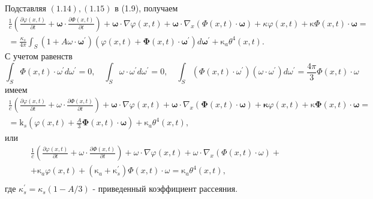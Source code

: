 Подставляя $(1.14),(1.15)$ в (1.9), получаем
\[
    \begin{gathered}
        \frac{1}{c}\left(\frac{\partial \varphi(x, t)}{\partial t}+\boldsymbol{\omega} \cdot
        \frac{\partial \Phi(x, t)}{\partial t}\right)+\boldsymbol{\omega} \cdot \nabla
        \varphi(x, t)+\boldsymbol{\omega} \cdot \nabla_{x}(\Phi(x, t) \cdot \boldsymbol{\omega})+\kappa
        \varphi(x, t)+\mathrm{\kappa} \Phi(x, t) \cdot \boldsymbol{\omega}= \\
        =\frac{\kappa_{s}}{4 \pi} \int_{S}\left(1+A \omega \cdot
        \boldsymbol{\omega}^{\prime}\right)\left(\varphi(x, t)+\boldsymbol{\Phi}(x, t)
        \cdot \boldsymbol{\omega}^{\prime}\right) d \boldsymbol{\omega}^{\prime}+\mathrm{\kappa}_{a} \theta^{4}(x, t).
    \end{gathered}
\]
С учетом равенств
\[
    \int_{S} \Phi(x, t) \cdot \omega^{\prime} d \omega^{\prime}=0, \quad \int_{S} \omega \cdot \omega^{\prime} d
    \omega^{\prime}=0, \quad \int_{S}\left(\Phi(x, t) \cdot \omega^{\prime}\right)\left(\omega \cdot
    \omega^{\prime}\right) d \omega^{\prime}=\frac{4 \pi}{3} \Phi(x, t) \cdot \omega
\]
имеем
\[
    \begin{gathered}
        \frac{1}{c}\left(\frac{\partial \varphi(x, t)}{\partial t}+\omega \cdot
        \frac{\partial \Phi(x, t)}{\partial t}\right)+\boldsymbol{\omega} \cdot
        \nabla \varphi(x, t)+\boldsymbol{\omega} \cdot \nabla_{x}(\boldsymbol{\Phi}(x, t)
        \cdot \boldsymbol{\omega})+\boldsymbol{\kappa} \varphi(x, t)+\mathrm{\kappa}
        \boldsymbol{\Phi}(x, t) \cdot \boldsymbol{\omega}= \\
        =\mathrm{k}_{s}\left(\varphi(x, t)+\frac{A}{3} \boldsymbol{\Phi}(x, t) \cdot
        \boldsymbol{\omega}\right)+\mathrm{\kappa}_{a} \theta^{4}(x, t),
    \end{gathered}
\]
или
\begin{gather*}
    \frac{1}{c}\left(\frac{\partial \varphi(x, t)}{\partial t}+\omega \cdot
    \frac{\partial \Phi(x, t)}{\partial t}\right)+\omega \cdot \nabla
    \varphi(x, t)+\omega \cdot \nabla_{x}(\Phi(x, t) \cdot \omega)+\\
    +\mathrm{\kappa}_{a} \varphi(x, t)+\left(\mathrm{\kappa}_{a}+\mathrm{\kappa}_{s}^{\prime}\right)
    \Phi(x, t) \cdot \omega=\mathrm{\kappa}_{a} \theta^{4}(x, t),\\
\end{gather*}
где $\kappa_{s}^{\prime}=\kappa_{s}(1-A / 3)$ - приведенный коэффициент рассеяния.


